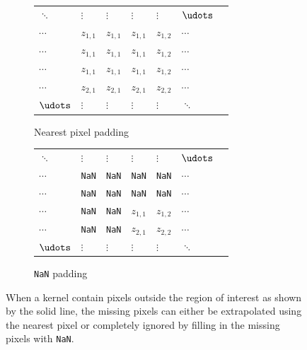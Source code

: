 \begin{figure}
  \centering
  \begin{subfigure}[b]{0.49\textwidth}
      \begin{tabular}{lllllll}
         $\ddots$ & $\vdots$ & $\vdots$ & $\vdots$ & $\vdots$ & $\udots$ \\
         $\cdots$ & $z_{1,1}$ & $z_{1,1}$ & $z_{1,1}$ & $z_{1,2}$ & $\cdots$ \\
         $\cdots$ & $z_{1,1}$ & $z_{1,1}$ & $z_{1,1}$ & $z_{1,2}$ & $\cdots$ \\ \cline{4-6}
         $\cdots$ & $z_{1,1}$ & \multicolumn{1}{l|}{$z_{1,1}$} & $z_{1,1}$ & $z_{1,2}$ & $\cdots$ \\
         $\cdots$ & $z_{2,1}$ & \multicolumn{1}{l|}{$z_{2,1}$}  & $z_{2,1}$ & $z_{2,2}$ & $\cdots$ \\
         $\udots$ & $\vdots$ & \multicolumn{1}{l|}{$\vdots$}  & $\vdots$ & $\vdots$ & $\ddots$
    \end{tabular}
    \caption{Nearest pixel padding}
    \label{fig:inference_padding_nearest}
  \end{subfigure}
  \begin{subfigure}[b]{0.49\textwidth}
      \begin{tabular}{lllllll}
         $\ddots$ & $\vdots$ & $\vdots$ & $\vdots$ & $\vdots$ & $\udots$ \\
         $\cdots$ & \texttt{NaN} & \texttt{NaN} & \texttt{NaN} & \texttt{NaN} & $\cdots$ \\
         $\cdots$ & \texttt{NaN} & \texttt{NaN} & \texttt{NaN} & \texttt{NaN} & $\cdots$ \\ \cline{4-6}
         $\cdots$ & \texttt{NaN} & \multicolumn{1}{l|}{\texttt{NaN}} & $z_{1,1}$ & $z_{1,2}$ & $\cdots$ \\
         $\cdots$ & \texttt{NaN} & \multicolumn{1}{l|}{\texttt{NaN}}  & $z_{2,1}$ & $z_{2,2}$ & $\cdots$ \\
         $\udots$ & $\vdots$ & \multicolumn{1}{l|}{$\vdots$}  & $\vdots$ & $\vdots$ & $\ddots$
    \end{tabular}
    \caption{\texttt{NaN} padding}
    \label{fig:inference_padding_nan}
  \end{subfigure}
  \caption{When a kernel contain pixels outside the region of interest as shown by the solid line, the missing pixels can either be extrapolated using the nearest pixel or completely ignored by filling in the missing pixels with \texttt{NaN}.}
  \label{fig:inference_padding}
\end{figure}


